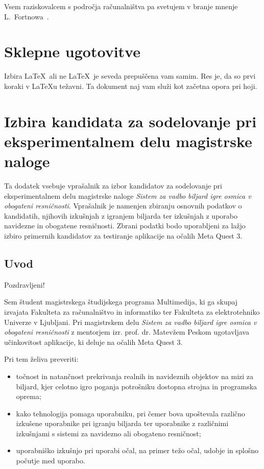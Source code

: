 \documentclass[a4paper, 12pt]{book}
\begin{document}
Vsem raziskovalcem s področja računalništva pa svetujem v branje mnenje L.\ Fortnowa~\cite{Fortnow}.

\chapter{Sklepne ugotovitve}
Izbira \LaTeX\ ali ne \LaTeX\ je seveda prepuščena vam samim. Res je, da so prvi koraki v \LaTeX{}u težavni. Ta dokument naj vam služi kot začetna opora pri hoji.

\appendix

\chapter{Izbira kandidata za sodelovanje pri eksperimentalnem delu magistrske naloge}
\label{app:izbira-kandidata}

Ta dodatek vsebuje vprašalnik za izbor kandidatov za sodelovanje pri
eksperimentalnem delu magistrske naloge \textit{Sistem za vadbo biljard igre
osmica v obogateni resničnosti}. Vprašalnik je namenjen zbiranju osnovnih
podatkov o kandidatih, njihovih izkušnjah z igranjem biljarda ter izkušnjah
z uporabo navidezne in obogatene resničnosti. Zbrani podatki bodo uporabljeni
za lažjo izbiro primernih kandidatov za testiranje aplikacije na očalih
Meta Quest 3.

\section{Uvod}

Pozdravljeni!

Sem študent magistrskega študijskega programa Multimedija, ki ga skupaj
izvajata Fakulteta za računalništvo in informatiko ter Fakulteta za
elektrotehniko Univerze v Ljubljani. Pri magistrskem delu \textit{Sistem za
vadbo biljard igre osmica v obogateni resničnosti} z mentorjem
izr. prof. dr. Matevžem Peskom ugotavljava učinkovitost aplikacije, ki
deluje na očalih Meta Quest 3.

Pri tem želiva preveriti:
\begin{itemize}
    \item točnost in natančnost prekrivanja realnih in navideznih objektov
    na mizi za biljard, kjer celotno igro poganja potrošniku dostopna strojna
    in programska oprema;
    \item kako tehnologija pomaga uporabniku, pri čemer bova upoštevala
    različno izkušene uporabnike pri igranju biljarda ter uporabnike z
    različnimi izkušnjami s sistemi za navidezno ali obogateno resničnost;
    \item uporabniško izkušnjo pri uporabi očal, na primer težo očal,
    udobje in splošno počutje med uporabo.
\end{itemize}
\end{document}
